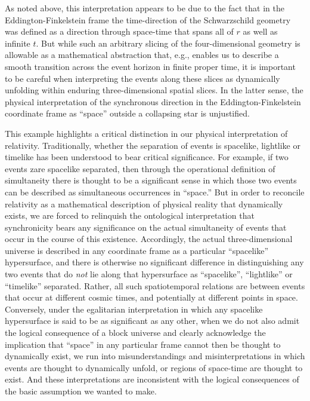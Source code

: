 \documentclass[aps,rmp,groupedaddress,twocolumn,10pt]{revtex4-2}
\begin{document}
As noted above, this interpretation appears to be due to the fact that in the Eddington-Finkelstein frame the time-direction of the Schwarzschild geometry was defined as a direction through space-time that spans all of $r$ as well as infinite $t$. But while such an arbitrary slicing of the four-dimensional geometry is allowable as a mathematical abstraction that, e.g., enables us to describe a smooth transition across the event horizon in finite proper time, it is important to be careful when interpreting the events along these slices as dynamically unfolding within enduring three-dimensional spatial slices. In the latter sense, the physical interpretation of the synchronous direction in the Eddington-Finkelstein coordinate frame as ``space'' outside a collapsing star is unjustified.

This example highlights a critical distinction in our physical interpretation of relativity. Traditionally, whether the separation of events is spacelike, lightlike or timelike has been understood to bear critical significance. For example, if two events zare spacelike separated, then through the operational definition of simultaneity there is thought to be a significant sense in which those two events can be described as simultaneous occurrences in ``space.'' But in order to reconcile relativity as a mathematical description of physical reality that dynamically exists, we are forced to relinquish the ontological interpretation that synchronicity bears any significance on the actual simultaneity of events that occur in the course of this existence. Accordingly, the actual three-dimensional universe is described in any coordinate frame as a particular ``spacelike'' hypersurface, and there is otherwise no significant difference in distinguishing any two events that do \textit{not} lie along that hypersurface as ``spacelike'', ``lightlike'' or ``timelike'' separated. Rather, all such spatiotemporal relations are between events that occur at different cosmic times, and potentially at different points in space. Conversely, under the egalitarian interpretation in which any spacelike hypersurface is said to be as significant as any other, when we do not also admit the logical consequence of a block universe and clearly acknowledge the implication that ``space'' in any particular frame cannot then be thought to dynamically exist, we run into misunderstandings and misinterpretations in which events are thought to dynamically unfold, or regions of space-time are thought to exist. And these interpretations are inconsistent with the logical consequences of the basic assumption we wanted to make.
\end{document}
